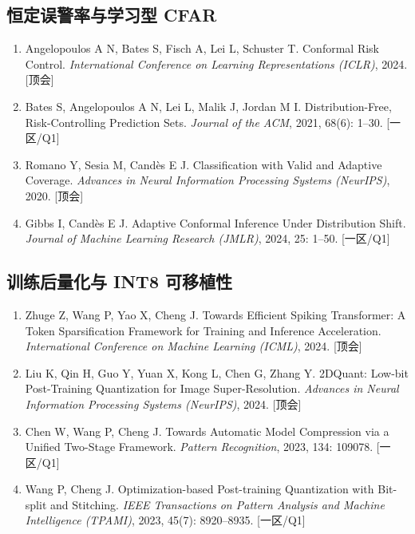 \subsection{恒定误警率与学习型 CFAR}\label{ux6052ux5b9aux8befux8b66ux7387ux4e0eux5b66ux4e60ux578b-cfar}

\begin{enumerate}
\def\labelenumi{\arabic{enumi}.}
\setcounter{enumi}{5}
\tightlist
\item
  Angelopoulos A N, Bates S, Fisch A, Lei L, Schuster T. Conformal Risk Control. \emph{International Conference on Learning Representations (ICLR)}, 2024. [顶会]
\item
  Bates S, Angelopoulos A N, Lei L, Malik J, Jordan M I. Distribution-Free, Risk-Controlling Prediction Sets. \emph{Journal of the ACM}, 2021, 68(6): 1–30. [一区/Q1]
\item
  Romano Y, Sesia M, Candès E J. Classification with Valid and Adaptive Coverage. \emph{Advances in Neural Information Processing Systems (NeurIPS)}, 2020. [顶会]
\item
  Gibbs I, Candès E J. Adaptive Conformal Inference Under Distribution Shift. \emph{Journal of Machine Learning Research (JMLR)}, 2024, 25: 1–50. [一区/Q1]
\end{enumerate}

\subsection{训练后量化与 INT8 可移植性}\label{ux8badux7ec3ux540eux91cfux5316ux4e0e-int8-ux53efux79fbux690dux6027}

\begin{enumerate}
\def\labelenumi{\arabic{enumi}.}
\setcounter{enumi}{9}
\tightlist
\item
  Zhuge Z, Wang P, Yao X, Cheng J. Towards Efficient Spiking Transformer: A Token Sparsification Framework for Training and Inference Acceleration. \emph{International Conference on Machine Learning (ICML)}, 2024. [顶会]
\item
  Liu K, Qin H, Guo Y, Yuan X, Kong L, Chen G, Zhang Y. 2DQuant: Low-bit Post-Training Quantization for Image Super-Resolution. \emph{Advances in Neural Information Processing Systems (NeurIPS)}, 2024. [顶会]
\item
  Chen W, Wang P, Cheng J. Towards Automatic Model Compression via a Unified Two-Stage Framework. \emph{Pattern Recognition}, 2023, 134: 109078. [一区/Q1]
\item
  Wang P, Cheng J. Optimization-based Post-training Quantization with Bit-split and Stitching. \emph{IEEE Transactions on Pattern Analysis and Machine Intelligence (TPAMI)}, 2023, 45(7): 8920–8935. [一区/Q1]
\end{enumerate}

